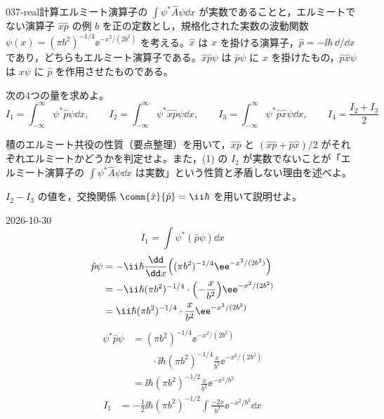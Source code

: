 \documentclass[uplatex,dvipdfmx,a4paper,11pt]{jsarticle}
\begin{document}
\begin{mondai}{037-real}{計算}{エルミート演算子の $\int\psi^{*}\hat{A}\psi\dd x$ が実数であることと，エルミートでない演算子 $\hat{x}\hat{p}$ の例}
$b$ を正の定数とし，規格化された実数の波動関数 $\psi(x)=(\pi b^{2})^{-1/4}\ee^{-x^{2}/(2b^{2})}$ を考える。$\hat{x}$ は $x$ を掛ける演算子，$\hat{p}=-\ii\hbar\,\dd/\dd x$ であり，どちらもエルミート演算子である。$\hat{x}\hat{p}\psi$ は $\hat{p}\psi$ に $x$ を掛けたもの，$\hat{p}\hat{x}\psi$ は $x\psi$ に $\hat{p}$ を作用させたものである。
  \begin{shoumon}
    \item 次の4つの量を求めよ。
      \[
        I_{1}=\int_{-\infty}^{\infty}\psi^{*}\hat{p}\psi\dd x,\qquad
        I_{2}=\int_{-\infty}^{\infty}\psi^{*}\hat{x}\hat{p}\psi\dd x,\qquad
        I_{3}=\int_{-\infty}^{\infty}\psi^{*}\hat{p}\hat{x}\psi\dd x,\qquad
        I_{4}=\frac{I_{2}+I_{3}}{2}
      \]
    \item 積のエルミート共役の性質（要点整理）を用いて，$\hat{x}\hat{p}$ と $(\hat{x}\hat{p}+\hat{p}\hat{x})/2$ がそれぞれエルミートかどうかを判定せよ。また，(1) の $I_{2}$ が実数でないことが「エルミート演算子の $\int\psi^{*}\hat{A}\psi\dd x$ は実数」という性質と矛盾しない理由を述べよ。
    \item $I_{2}-I_{3}$ の値を，交換関係 $\comm{\hat{x}}{\hat{p}}=\ii\hbar$ を用いて説明せよ。
  \end{shoumon}
\begin{kotaeutsushi}{2026-10-30}
\[ I_{1}=\int\psi^{*}(\hat{p}\psi)\dd x \]
\begin{align*}
\hat{p}\psi&=-\ii\hbar\frac{\dd}{\dd x}\Bigl((\pi b^{2})^{-1/4}\ee^{-x^{2}/(2b^{2})}\Bigr)\\
&=-\ii\hbar(\pi b^{2})^{-1/4}\cdot\Bigl(-\frac{x}{b^{2}}\Bigr)\ee^{-x^{2}/(2b^{2})}\\
&=\ii\hbar(\pi b^{2})^{-1/4}\cdot\frac{x}{b^{2}}\ee^{-x^{2}/(2b^{2})}
\end{align*}
\begin{align*}
\psi^{*}\hat{p}\psi&=(\pi b^{2})^{-1/4}\ee^{-x^{2}/(2b^{2})}\\
&\qquad\cdot\ii\hbar(\pi b^{2})^{-1/4}\frac{x}{b^{2}}\ee^{-x^{2}/(2b^{2})}\\
&=\ii\hbar(\pi b^{2})^{-1/2}\frac{x}{b^{2}}\ee^{-x^{2}/b^{2}}
\end{align*}
\begin{align*}
I_{1}&=-\frac{1}{2}\ii\hbar(\pi b^{2})^{-1/2}\int\frac{-2x}{b^{2}}\ee^{-x^{2}/b^{2}}\dd x\\

\end{align*}
\end{kotaeutsushi}
\end{mondai}
\end{document}
